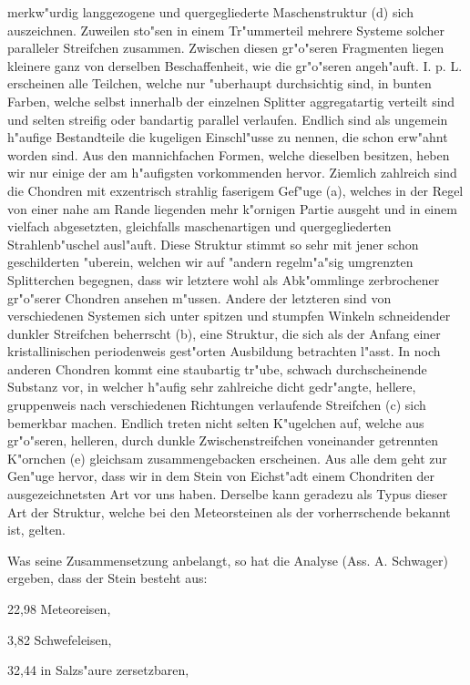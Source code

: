 \documentclass[a4paper, 11pt, oneside]{article}
\begin{document}
merkw"urdig langgezogene und quergegliederte Maschenstruktur (d) sich auszeichnen. Zuweilen sto"sen in einem Tr"ummerteil mehrere Systeme solcher paralleler Streifchen zusammen. Zwischen diesen gr"o"seren Fragmenten liegen kleinere ganz von derselben Beschaffenheit, wie die gr"o"seren angeh"auft. I. p. L. erscheinen alle Teilchen, welche nur "uberhaupt durchsichtig sind, in bunten Farben, welche selbst innerhalb der einzelnen Splitter aggregatartig verteilt sind und selten streifig oder bandartig parallel verlaufen. Endlich sind als ungemein h"aufige Bestandteile die kugeligen Einschl"usse zu nennen, die schon erw"ahnt worden sind. Aus den mannichfachen Formen, welche dieselben besitzen, heben wir nur einige der am h"aufigsten vorkommenden hervor. Ziemlich zahlreich sind die Chondren mit exzentrisch strahlig faserigem Gef"uge (a), welches in der Regel von einer nahe am Rande liegenden mehr k"ornigen Partie ausgeht und in einem vielfach abgesetzten, gleichfalls maschenartigen und quergegliederten Strahlenb"uschel ausl"auft. Diese Struktur stimmt so sehr mit jener schon geschilderten "uberein, welchen wir auf "andern regelm"a"sig umgrenzten Splitterchen begegnen, dass wir letztere wohl als Abk"ommlinge zerbrochener gr"o"serer Chondren ansehen m"ussen. Andere der letzteren sind von verschiedenen Systemen sich unter spitzen und stumpfen Winkeln schneidender dunkler Streifchen beherrscht (b), eine Struktur, die sich als der Anfang einer kristallinischen periodenweis gest"orten Ausbildung betrachten l"asst. In noch anderen Chondren kommt eine staubartig tr"ube, schwach durchscheinende Substanz vor, in welcher h"aufig sehr zahlreiche dicht gedr"angte, hellere, gruppenweis nach verschiedenen Richtungen verlaufende Streifchen (c) sich bemerkbar machen. Endlich treten nicht selten K"ugelchen auf, welche aus gr"o"seren, helleren, durch dunkle Zwischenstreifchen voneinander getrennten K"ornchen (e) gleichsam zusammengebacken erscheinen. Aus alle dem geht zur Gen"uge hervor, dass wir in dem Stein von Eichst"adt einem Chondriten der ausgezeichnetsten Art vor uns haben. Derselbe kann geradezu als Typus dieser Art der Struktur, welche bei den Meteorsteinen als der vorherrschende bekannt ist, gelten.

Was seine Zusammensetzung anbelangt, so hat die Analyse (Ass. A. Schwager) ergeben, dass der Stein besteht aus:

22,98 Meteoreisen,

3,82 Schwefeleisen,

32,44 in Salzs"aure zersetzbaren,
\end{document}
